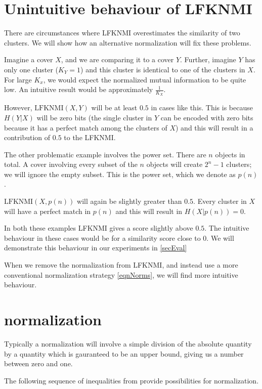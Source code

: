 \documentclass[9pt,technote]{IEEEtran}
\begin{document}
\section{Unintuitive behaviour of LFKNMI}
\label{secUnintuitive}
There are circumstances where LFKNMI overestimates the similarity of two clusters.
We will show how an alternative normalization will fix these problems.

Imagine a cover $X$, and we are comparing it to a cover $Y$. Further, imagine $Y$ has only one
cluster ($K_Y=1$) and this cluster is identical to one of the clusters in $X$.
For large $K_x$, we would expect the normalized mutual information to be quite low.
An intuitive result would be approximately $\frac1{K_X}$.

However, $\mbox{LFKNMI}(X,Y)$ will be at least $0.5$ in cases like this.
This is because $H(Y|X)$ will be zero bits
(the single cluster in $Y$ can be encoded with zero bits because it has a perfect match among the clusters of $X$)
and this will result in a contribution of $0.5$ to the LFKNMI.

The other problematic example involves the power set. There are $n$ objects in total.
A cover involving every subset of the $n$ objects will create $2^n - 1$ clusters; we will ignore the empty subset.
This is the power set, which we denote as $p(n)$.

$\mbox{LFKNMI}(X, p(n))$ will again be slightly greater than $0.5$. Every cluster in $X$ will
have a perfect match in $p(n)$ and this will result in $H(X|p(n)) = 0$.

In both these examples LFKNMI gives a score slightly above $0.5$. The intuitive behaviour
in these cases would be for a similarity score close to $0$.
We will demonstrate this behaviour in our experiments in \cref{secEval}

When we remove the
normalization from LFKNMI, and instead use a more conventional normalization strategy
\cref{eqnNorms}, we will find more intuitive behaviour.

\section{normalization}
\label{secNormalization}

Typically a normalization will involve a simple division of the absolute quantity
by a quantity which is gauranteed to be an upper bound, giving us a number between
zero and one.

The following sequence of inequalities from \citet{VinhEppsBailey} provide possibilities for normalization.
\end{document}

